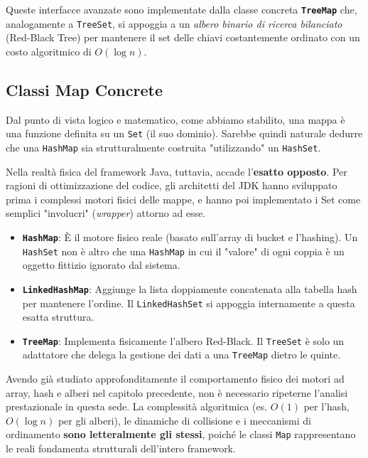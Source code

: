 \begin{observation}
Queste interfacce avanzate sono implementate dalla classe concreta \textbf{\texttt{TreeMap}} che, analogamente a \texttt{TreeSet}, si appoggia a un \textit{albero binario di ricerca bilanciato} (Red-Black Tree) per mantenere il set delle chiavi costantemente ordinato con un costo algoritmico di $O(\log n)$.
\end{observation}

\subsection{Classi Map Concrete}

Dal punto di vista logico e matematico, come abbiamo stabilito, una mappa è una funzione definita su un \texttt{Set} (il suo dominio). Sarebbe quindi naturale dedurre che una \texttt{HashMap} sia strutturalmente costruita "utilizzando" un \texttt{HashSet}.

Nella realtà fisica del framework Java, tuttavia, accade l'\textbf{esatto opposto}. Per ragioni di ottimizzazione del codice, gli architetti del JDK hanno sviluppato prima i complessi motori fisici delle mappe, e hanno poi implementato i Set come semplici "involucri" (\textit{wrapper}) attorno ad esse.

\begin{itemize}
    \item \textbf{\texttt{HashMap}}: È il motore fisico reale (basato sull'array di bucket e l'hashing). Un \texttt{HashSet} non è altro che una \texttt{HashMap} in cui il "valore" di ogni coppia è un oggetto fittizio ignorato dal sistema.
    \item \textbf{\texttt{LinkedHashMap}}: Aggiunge la lista doppiamente concatenata alla tabella hash per mantenere l'ordine. Il \texttt{LinkedHashSet} si appoggia internamente a questa esatta struttura.
    \item \textbf{\texttt{TreeMap}}: Implementa fisicamente l'albero Red-Black. Il \texttt{TreeSet} è solo un adattatore che delega la gestione dei dati a una \texttt{TreeMap} dietro le quinte.
\end{itemize}

\medskip

Avendo già studiato approfonditamente il comportamento fisico dei motori ad array, hash e alberi nel capitolo precedente, non è necessario ripeterne l'analisi prestazionale in questa sede. La complessità algoritmica (es. $O(1)$ per l'hash, $O(\log n)$ per gli alberi), le dinamiche di collisione e i meccanismi di ordinamento \textbf{sono letteralmente gli stessi}, poiché le classi \texttt{Map} rappresentano le reali fondamenta strutturali dell'intero framework.

